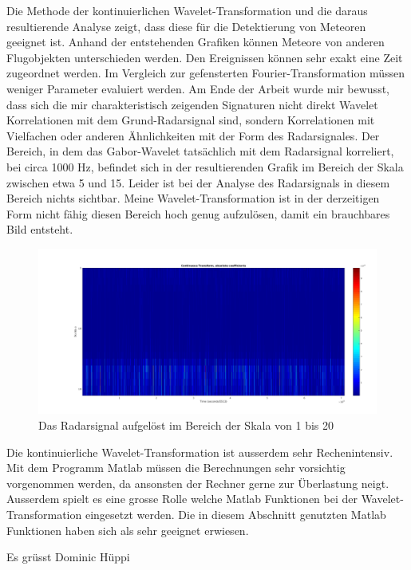 \begin{refsection}
Die Methode der kontinuierlichen Wavelet-Transformation und die daraus resultierende Analyse zeigt, dass diese für die Detektierung von Meteoren geeignet ist.
Anhand der entstehenden Grafiken können Meteore von anderen Flugobjekten unterschieden werden.
Den Ereignissen können sehr exakt eine Zeit zugeordnet werden.
Im Vergleich zur gefensterten Fourier-Transformation müssen weniger Parameter evaluiert werden.
Am Ende der Arbeit wurde mir bewusst, dass sich die mir charakteristisch zeigenden Signaturen nicht direkt Wavelet Korrelationen mit dem Grund-Radarsignal sind, sondern Korrelationen mit Vielfachen oder anderen Ähnlichkeiten mit der Form des Radarsignales.
Der Bereich, in dem das Gabor-Wavelet tatsächlich mit dem Radarsignal korreliert, bei circa 1000 Hz, befindet sich in der resultierenden Grafik im Bereich der Skala zwischen etwa 5 und 15.
Leider ist bei der Analyse des Radarsignals in diesem Bereich nichts sichtbar.
Meine Wavelet-Transformation ist in der derzeitigen Form nicht fähig diesen Bereich hoch genug aufzulösen, damit ein brauchbares Bild entsteht.
\begin{figure}[h!]
	\centering
	\includegraphics[width=\linewidth]{papers/meteor/images/anomalie/cwt_signal_scale1to20.png}
	\caption{Das Radarsignal aufgelöst im Bereich der Skala von 1 bis 20}
	\label{fig:signalmitwscaloscale1to20}
\end{figure}

Die kontinuierliche Wavelet-Transformation ist ausserdem sehr Rechenintensiv. 
Mit dem Programm Matlab müssen die Berechnungen sehr vorsichtig vorgenommen werden, da ansonsten der Rechner gerne zur Überlastung neigt.
Ausserdem spielt es eine grosse Rolle welche Matlab Funktionen bei der Wavelet-Transformation eingesetzt werden.
Die in diesem Abschnitt genutzten Matlab Funktionen haben sich als sehr geeignet erwiesen.  

Es grüsst Dominic Hüppi

\printbibliography[heading=subbibliography]
\end{refsection}
